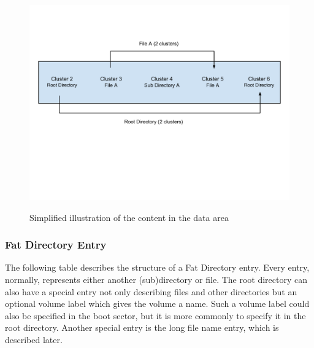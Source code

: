 \begin{figure}[h!]
\caption{Simplified illustration of the content in the data area}
\centering
\includegraphics[scale=0.62]{figures/fat_data_area}
\label{figure:data_area}
\end{figure}

\subsubsection{Fat Directory Entry}

The following table describes the structure of a Fat Directory entry. Every entry, normally, represents either another (sub)directory or file. The root directory can also have a special entry not only describing files and other directories but an optional volume label which gives the volume a name. Such a volume label could also be specified in the boot sector, but it is more commonly to specify it in the root directory. Another special entry is the long file name entry, which is described later.

